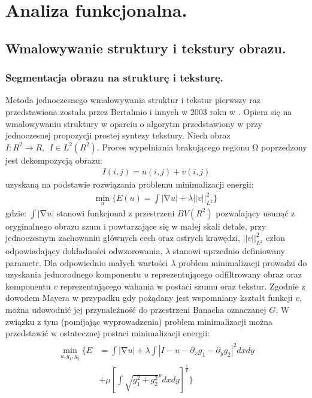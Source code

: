 \documentclass[12pt, twoside, openany]{report}
\theoremstyle{definition}
\begin{document}
\chapter{Analiza funkcjonalna.}
\section{Wmalowywanie struktury i tekstury obrazu.}\label{chap:StructureTextureNavierStokes}
\subsection{Segmentacja obrazu na strukturę i teksturę.}
Metoda jednoczesnego wmalowywania struktur i tekstur pierwszy raz przedstawiona została przez Bertalmio i innych w 2003 roku w \cite{NavierStokesAndTexturePropagation}. Opiera się na wmalowywaniu struktury w oparciu o algorytm przedstawiony w \cite{bertalmio2000image} przy jednoczesnej propozycji prostej syntezy tekstury. Niech obraz $I:R^2\to R,\ \ I\in L^2(R^2)$. Proces wypełniania brakującego regionu $\mathrm{\Omega }$ poprzedzony jest dekompozycją obrazu:
\begin{align}
I\left(i,j\right)=u\left(i,j\right)+v\left(i,j\right) 
\label{STRUCTURETEXTURE1}
\end{align}
uzyskaną na podstawie rozwiązania problemu minimalizacji energii:
\begin{align} 
{\mathop{\mathrm{min}}_{u} \Biggl\{E\left(u\right)=\int{\left|\mathrm{\nabla }u\right|+\lambda {\left|\left|v\right|\right|}^2_{L^2}}\Biggr\}\ }
\label{STRUCTURETEXTURE2}
\end{align}
gdzie: $\int{\left|\mathrm{\nabla }u\right|}$ stanowi funkcjonał z przestrzeni $BV(R^2)$ pozwalający usunąć z oryginalnego obrazu szum i powtarzające się w małej skali detale, przy jednoczesnym zachowaniu głównych cech oraz ostrych krawędzi, ${\left|\left|v\right|\right|}^2_{L^2}$ człon odpowiadający dokładności odwzorowania, $\lambda $ stanowi uprzednio definiowany parametr. Dla odpowiednio małych wartości $\lambda $ problem minimalizacji prowadzi do uzyskania jednorodnego komponentu $u$ reprezentującego odfiltrowany obraz oraz komponentu $v$ reprezentującego wahania w postaci szumu oraz tekstur. Zgodnie z dowodem Mayera w przypadku gdy pożądany jest wspomniany kształt funkcji $v$, można udowodnić jej  przynależność do przestrzeni Banacha oznaczanej $G$. W związku z tym (pomijając wyprowadzenia) problem minimalizacji można przedstawić w ostatecznej postaci minimalizacji energii:
\begin{align}
\begin{aligned} 
\mathop{\mathrm{min}}_{u,g_1,g_2} \Biggl\{E &= \int{\left|\mathrm{\nabla }u\right|+\lambda \int{{\left|I-u-{\partial }_xg_1-{\partial }_yg_2\right|}^2dxdy}} \\
&+ \mu {\left[\int{{\sqrt{g^2_1+g^2_2}}^pdxdy}\right]}^{\frac{1}{p}}\Biggr\}
\end{aligned}
\end{align}
\end{document}
